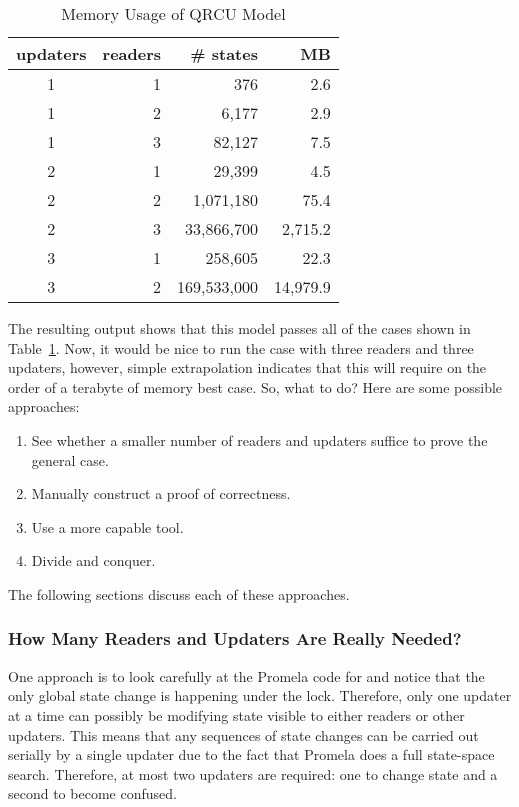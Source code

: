 \begin{table}
\begin{center}
\begin{tabular}{c|r|r|r}
	updaters &
	    readers &
		   \# states & MB \\
	\hline
	1 & 1 &         376 &      2.6 \\
	\hline
	1 & 2 &       6,177 &      2.9 \\
	\hline
	1 & 3 &      82,127 &      7.5 \\
	\hline
	2 & 1 &      29,399 &      4.5 \\
	\hline
	2 & 2 &   1,071,180 &     75.4 \\
	\hline
	2 & 3 &  33,866,700 &  2,715.2 \\
	\hline
	3 & 1 &     258,605 &     22.3 \\
	\hline
	3 & 2 & 169,533,000 & 14,979.9 \\
\end{tabular}
\end{center}
\caption{Memory Usage of QRCU Model}
\label{tab:advsync:Memory Usage of QRCU Model}
\end{table}

The resulting output shows that this model passes all of the cases
shown in
Table~\ref{tab:advsync:Memory Usage of QRCU Model}.
Now, it would be nice to run the case with three readers and three
updaters, however, simple extrapolation indicates that this will
require on the order of a terabyte of memory best case.
So, what to do?
Here are some possible approaches:

\begin{enumerate}
\item	See whether a smaller number of readers and updaters suffice
	to prove the general case.
\item	Manually construct a proof of correctness.
\item	Use a more capable tool.
\item	Divide and conquer.
\end{enumerate}

The following sections discuss each of these approaches.

\subsubsection{How Many Readers and Updaters Are Really Needed?}
\label{sec:formal:How Many Readers and Updaters Are Really Needed?}

One approach is to look carefully at the Promela code for
 and notice that the only global state
change is happening under the lock.
Therefore, only one updater at a time can possibly be modifying
state visible to either readers or other updaters.
This means that any sequences of state changes can be carried
out serially by a single updater due to the fact that Promela does a full
state-space search.
Therefore, at most two updaters are required: one to change state
and a second to become confused.


